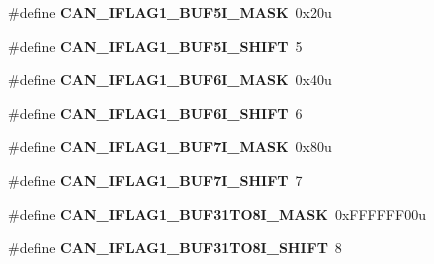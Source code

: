 \begin{DoxyCompactItemize}
\item 
\#define {\bfseries C\+A\+N\+\_\+\+I\+F\+L\+A\+G1\+\_\+\+B\+U\+F5\+I\+\_\+\+M\+A\+SK}~0x20u\hypertarget{group__CAN__Register__Masks_ga5ba2a22d90a915a0504e74e0be2ae46e}{}\label{group__CAN__Register__Masks_ga5ba2a22d90a915a0504e74e0be2ae46e}

\item 
\#define {\bfseries C\+A\+N\+\_\+\+I\+F\+L\+A\+G1\+\_\+\+B\+U\+F5\+I\+\_\+\+S\+H\+I\+FT}~5\hypertarget{group__CAN__Register__Masks_ga4eef45eb97993797f0e4d25d84ae98ae}{}\label{group__CAN__Register__Masks_ga4eef45eb97993797f0e4d25d84ae98ae}

\item 
\#define {\bfseries C\+A\+N\+\_\+\+I\+F\+L\+A\+G1\+\_\+\+B\+U\+F6\+I\+\_\+\+M\+A\+SK}~0x40u\hypertarget{group__CAN__Register__Masks_ga0aec3c62d96f6f8e8afd046065838df7}{}\label{group__CAN__Register__Masks_ga0aec3c62d96f6f8e8afd046065838df7}

\item 
\#define {\bfseries C\+A\+N\+\_\+\+I\+F\+L\+A\+G1\+\_\+\+B\+U\+F6\+I\+\_\+\+S\+H\+I\+FT}~6\hypertarget{group__CAN__Register__Masks_gac3a088607f853fdddfc0011293e1c336}{}\label{group__CAN__Register__Masks_gac3a088607f853fdddfc0011293e1c336}

\item 
\#define {\bfseries C\+A\+N\+\_\+\+I\+F\+L\+A\+G1\+\_\+\+B\+U\+F7\+I\+\_\+\+M\+A\+SK}~0x80u\hypertarget{group__CAN__Register__Masks_gacc148d0c9e26a80f08110dc2c5045809}{}\label{group__CAN__Register__Masks_gacc148d0c9e26a80f08110dc2c5045809}

\item 
\#define {\bfseries C\+A\+N\+\_\+\+I\+F\+L\+A\+G1\+\_\+\+B\+U\+F7\+I\+\_\+\+S\+H\+I\+FT}~7\hypertarget{group__CAN__Register__Masks_ga327609a9678df5c8c34053d43b550422}{}\label{group__CAN__Register__Masks_ga327609a9678df5c8c34053d43b550422}

\item 
\#define {\bfseries C\+A\+N\+\_\+\+I\+F\+L\+A\+G1\+\_\+\+B\+U\+F31\+T\+O8\+I\+\_\+\+M\+A\+SK}~0x\+F\+F\+F\+F\+F\+F00u\hypertarget{group__CAN__Register__Masks_ga70c705b79c7bd7451ebdee6bc0ba6f1c}{}\label{group__CAN__Register__Masks_ga70c705b79c7bd7451ebdee6bc0ba6f1c}

\item 
\#define {\bfseries C\+A\+N\+\_\+\+I\+F\+L\+A\+G1\+\_\+\+B\+U\+F31\+T\+O8\+I\+\_\+\+S\+H\+I\+FT}~8\hypertarget{group__CAN__Register__Masks_gaeb0d9f42c855b318796736ab6cc2de75}{}\label{group__CAN__Register__Masks_gaeb0d9f42c855b318796736ab6cc2de75}


\end{DoxyCompactItemize}
